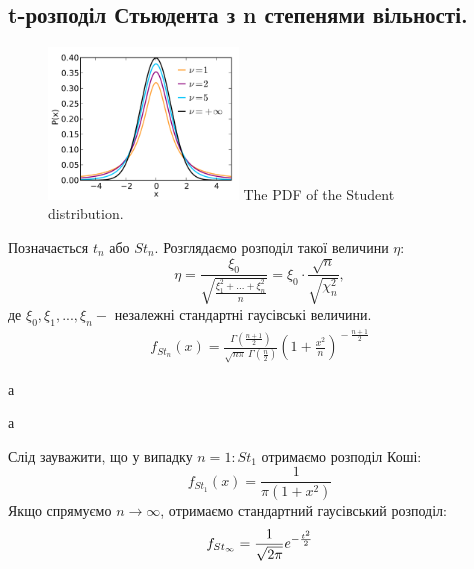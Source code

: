 \subsection{t-розподіл Стьюдента з n степенями вільності.}
\begin{figure}
\centering
\includegraphics[width=0.45\textwidth]{assets/lectures_part_3-91d0349d.png}
The PDF of the Student distribution.
\end{figure}
Позначається $t_n $ або $ St_n$. Розглядаємо розподіл такої величини $\eta$:
$$\eta = \frac{\xi_0}{\sqrt{ \frac{\xi_1^2 + ... + \xi_n^2}{n} }} = \xi_0 \cdot \frac{\sqrt{n}}{ \sqrt{
\chi^2_n
}} ,$$
де $\xi_0, \xi_1, ... , \xi_n - $ незалежні стандартні гаусівські величини.
$$
\begin{gathered}
f_{St_n}(x) = \frac{\Gamma(\frac{n+1}{2})} {\sqrt{n\pi}\,\Gamma(\frac{n}{2})} \left(1+\frac{x^2}{n} \right)^{\!-\frac{n+1}{2}}
\end{gathered}
$$

$а$\\
\par
$а$\\
\par
Слід зауважити, що у випадку $n = 1 : St_1$ отримаємо розподіл Коші:
$$
f_{St_1} (x) = \frac{1}{ \pi ( 1 + x^2)}
$$
Якщо спрямуємо $n \to \infty$, отримаємо стандартний гаусівський розподіл:
$$
f_{St_\infty} = \frac{1}{\sqrt{2 \pi}} e^{- \frac{t^2}{2} }
$$



